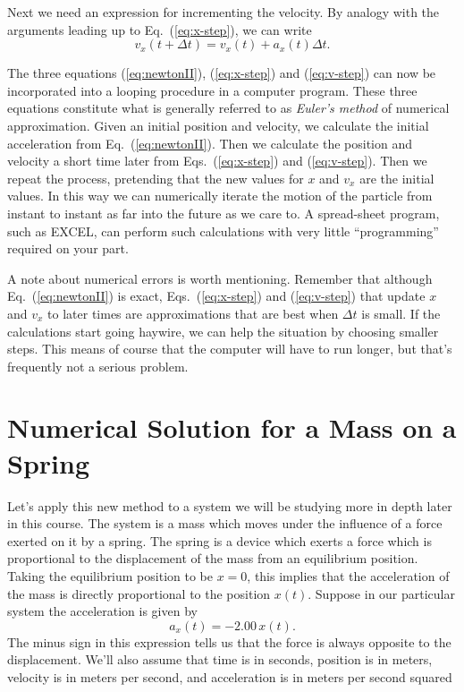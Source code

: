 Next we need an expression for incrementing the velocity.  By analogy
with the arguments leading up to Eq.~(\ref{eq:x-step}), we can write
\begin{equation}
  v_x(t+\Delta t) = v_x(t) + a_x(t)\Delta t.
  \label{eq:v-step}
\end{equation}

The three equations (\ref{eq:newtonII}), (\ref{eq:x-step}) and
(\ref{eq:v-step}) can now be incorporated into a looping procedure in
a computer program.  These three equations constitute what is
generally referred to as {\em Euler's method} of numerical
approximation.  Given an initial position and velocity, we calculate
the initial acceleration from Eq.~(\ref{eq:newtonII}).  Then we
calculate the position and velocity a short time later from
Eqs.~(\ref{eq:x-step}) and (\ref{eq:v-step}).  Then we repeat the
process, pretending that the new values for $x$ and $v_x$ are the
initial values.  In this way we can numerically iterate the motion of
the particle from instant to instant as far into the future as we care
to.  A spread-sheet program, such as EXCEL, can perform such
calculations with very little ``programming'' required on your part.

A note about numerical errors is worth mentioning.  Remember that
although Eq.~(\ref{eq:newtonII}) is exact, Eqs.~(\ref{eq:x-step}) and
(\ref{eq:v-step}) that update $x$ and $v_x$ to later times are
approximations that are best when $\Delta t$ is small.  If the
calculations start going haywire, we can help the situation by
choosing smaller steps.  This means of course that the computer will
have to run longer, but that's frequently not a serious problem.

\section{Numerical Solution for a Mass on a Spring}

Let's apply this new method to a system we will be studying more in
depth later in this course.  The system is a mass which moves under
the influence of a force exerted on it by a spring.  The spring is a
device which exerts a force which is proportional to the displacement
of the mass from an equilibrium position.  Taking the equilibrium
position to be $x = 0$, this implies that the acceleration of the mass
is directly proportional to the position $x(t)$.  Suppose in our
particular system the acceleration is given by 
\begin{equation}
a_x(t) = -2.00\, x(t).
\end{equation}
The minus sign in this expression tells us that the force is
always opposite to the displacement.  We'll also assume that time is
in seconds, position is in meters, velocity is in meters per second,
and acceleration is in meters per second squared
   
